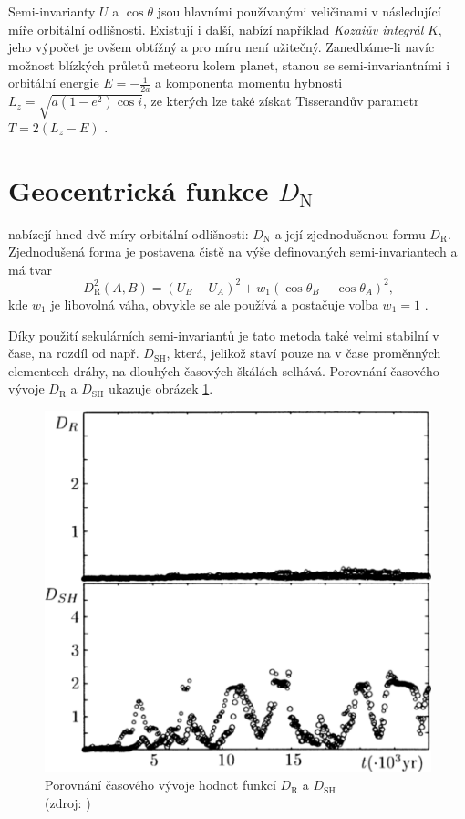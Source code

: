 \medskip

Semi-invarianty $U$ a $\cos{\theta}$ jsou hlavními používanými veličinami v následující míře orbitální odlišnosti. Existují i další, \cite{newapproach} nabízí například \textit{Kozaiův integrál} $K$, jeho výpočet je ovšem obtížný a pro míru není užitečný. Zanedbáme-li navíc možnost blízkých průletů meteoru kolem planet, stanou se semi-invariantními i orbitální energie $E=-\frac{1}{2a}$ a komponenta momentu hybnosti $L_z=\sqrt{a(1-e^2)\cos{i}}$, ze kterých lze také získat Tisserandův parametr $T=2(L_z-E)$ \cite{newapproach}.

\section{Geocentrická funkce $D_\text{N}$}%
\citeauthor{newapproach} nabízejí hned dvě míry orbitální odlišnosti: $D_\text{N}$ a její zjednodušenou formu $D_\text{R}$. Zjednodušená forma je postavena čistě na výše definovaných semi-invariantech a má tvar \cite{newapproach}
\begin{equation}
    D_\text{R}^2(A,B)=\left( U_B-U_A \right)^2+w_1\left( \cos{\theta_B} - \cos{\theta_A} \right)^2\text{,}
\end{equation}
kde $w_1$ je libovolná váha, obvykle se ale používá a postačuje volba $w_1=1$ \cite{newapproach}\cite{galligan}.

Díky použití sekulárních semi-invariantů je tato metoda také velmi stabilní v čase, na rozdíl od např. $D_\text{SH}$, která, jelikož staví pouze na v čase proměnných elementech dráhy, na dlouhých časových škálách selhává. Porovnání časového vývoje $D_\text{R}$ a $D_\text{SH}$ ukazuje obrázek \ref{img:new:time}.

\begin{figure}[ht]
    \centering
    \includegraphics[width=0.5\linewidth]{img/plots/newapproach-time-evolution.png}
    \caption[Porovnání časového vývoje hodnot funkcí $D_\text{R}$ a $D_\text{SH}$]{
        Porovnání časového vývoje hodnot funkcí $D_\text{R}$ a $D_\text{SH}$\\
        {\small (zdroj: \cite{newapproach})}
    }
    \label{img:new:time}
\end{figure}

